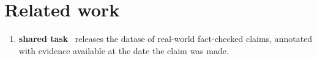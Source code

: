 \begin{minipage}{\linewidth}
    \label{fig:pipeline}
\end{minipage}
\vspace{1em}

\section{Related work}
\label{sec:relwork}
\label{avscore}
\begin{enumerate}
    \item \textbf{\averitec{} shared task}~\cite{averitec2024} releases the datase of real-world fact-checked claims, annotated with evidence available at the date the claim was made.
\end{enumerate}

